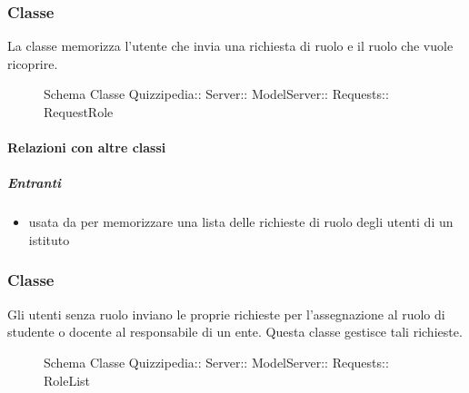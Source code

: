 \subsubsection{Classe }
La classe memorizza l'utente che invia una richiesta di ruolo e il ruolo che vuole ricoprire.
\begin{figure}[H]
\centering
\noindent{}
\caption[Schema Classe RequestRole]{Schema Classe Quizzipedia:: Server:: ModelServer:: Requests:: RequestRole}
\end{figure}
\paragraph{Relazioni con altre classi}
\subparagraph{Entranti}
\begin{itemize}
\item usata da  per memorizzare una lista delle richieste di ruolo degli utenti di un istituto
\end{itemize}
\subsubsection{Classe }
Gli utenti senza ruolo inviano le proprie richieste per l'assegnazione al ruolo di studente o docente al responsabile di un ente. Questa classe gestisce tali richieste.
\begin{figure}[H]
\centering
\noindent{}
\caption[Schema Classe RoleList]{Schema Classe Quizzipedia:: Server:: ModelServer:: Requests:: RoleList}
\end{figure}
